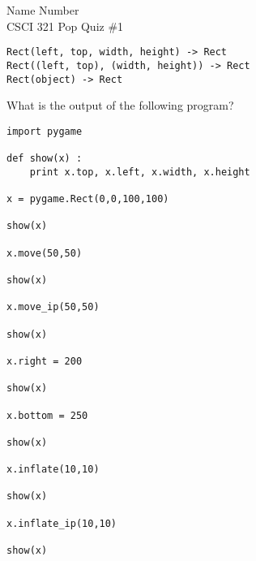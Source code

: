 \documentclass{article}
\begin{document}
Name \hrulefill Number \hrulefill\\
CSCI 321 Pop Quiz \#1

\begin{Verbatim}[frame=single,label=Rect specs]
Rect(left, top, width, height) -> Rect
Rect((left, top), (width, height)) -> Rect
Rect(object) -> Rect
\end{Verbatim}

What is the output of the following program?
\begin{Verbatim}
import pygame

def show(x) :
    print x.top, x.left, x.width, x.height

x = pygame.Rect(0,0,100,100)
    
show(x)

x.move(50,50)

show(x)

x.move_ip(50,50)

show(x)

x.right = 200

show(x)

x.bottom = 250

show(x)

x.inflate(10,10)

show(x)

x.inflate_ip(10,10)

show(x)

\end{Verbatim}
\end{document}
